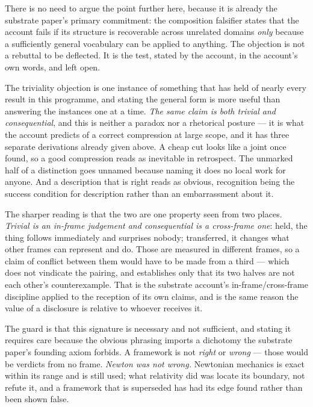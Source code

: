 \documentclass[11pt,a4paper]{article}
\theoremstyle{remark}\newtheorem{remark}[definition]{Remark}
\begin{document}
There is no need to argue the point further here, because it is already the substrate paper's primary
commitment: the composition falsifier states that the account fails if its structure is recoverable
across unrelated domains \emph{only} because a sufficiently general vocabulary can be applied to
anything. The objection is not a rebuttal to be deflected. It is the test, stated by the account, in
the account's own words, and left open.

The triviality objection is one instance of something that has held of nearly every result in this
programme, and stating the general form is more useful than answering the instances one at a time.
\emph{The same claim is both trivial and consequential}, and this is neither a paradox nor a rhetorical
posture --- it is what the account predicts of a correct compression at large scope, and it has three
separate derivations already given above. A cheap cut looks like a joint once found, so a good
compression reads as inevitable in retrospect. The unmarked half of a distinction goes unnamed because
naming it does no local work for anyone. And a description that is right reads as obvious, recognition
being the success condition for description rather than an embarrassment about it.

The sharper reading is that the two are one property seen from two places. \emph{Trivial is an in-frame
judgement and consequential is a cross-frame one}: held, the thing follows immediately and surprises
nobody; transferred, it changes what other frames can represent and do. Those are measured in different
frames, so a claim of conflict between them would have to be made from a third --- which does not
vindicate the pairing, and establishes only that its two halves are not each other's counterexample.
That is the substrate account's in-frame/cross-frame discipline applied to the reception of its own claims, and is the same reason the value of a disclosure is
relative to whoever receives it.

The guard is that this signature is necessary and not sufficient, and stating it requires care because
the obvious phrasing imports a dichotomy the substrate paper's founding axiom forbids. A framework is not
\emph{right} or \emph{wrong} --- those would be verdicts from no frame. \emph{Newton was not wrong.}
Newtonian mechanics is exact within its range and is still used; what relativity did was locate its
boundary, not refute it, and a framework that is superseded has had its edge found rather than been
shown false.
\end{document}
